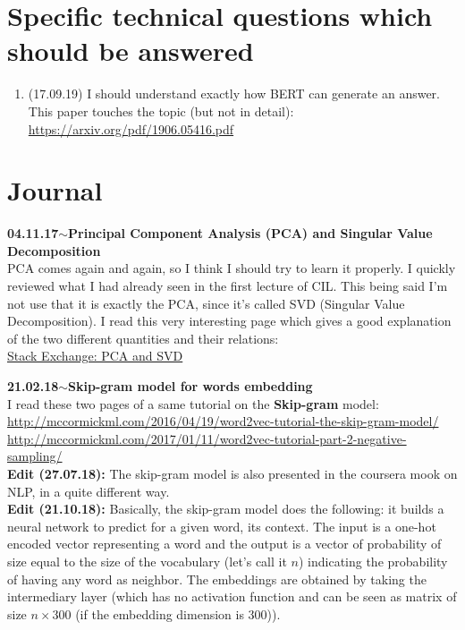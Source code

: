 \documentclass[11pt,a4paper]{article}
\newenvironment{loggentry}[2]%
{\noindent\textbf{#1}\hspace{1cm}$\mathbf{\sim}$\text{ }\textbf{#2}\\}{\vspace{0.5cm}}
\begin{document}
\section{Specific technical questions which should be answered}
\begin{enumerate}
\item (17.09.19) I should understand exactly how BERT can generate an answer. This paper touches the topic (but not in detail):\\
\url{https://arxiv.org/pdf/1906.05416.pdf}
\end{enumerate}

\section{Journal}

\begin{loggentry}{04.11.17}{Principal Component Analysis (PCA) and Singular Value Decomposition}
PCA comes again and again, so I think I should try to learn it properly. I quickly reviewed what I had already seen in the first lecture of CIL. This being said I'm not use that it is exactly the PCA, since it's called SVD (Singular Value Decomposition). I read this very interesting page which gives a good explanation of the two different quantities and their relations:\\
\href{https://stats.stackexchange.com/questions/134282/relationship-between-svd-and-pca-how-to-use-svd-to-perform-pca#134283}{Stack Exchange: PCA and SVD}\\
\end{loggentry}

\begin{loggentry}{21.02.18}{Skip-gram model for words embedding}
I read these two pages of a same tutorial on the \textbf{Skip-gram} model:\\
\url{http://mccormickml.com/2016/04/19/word2vec-tutorial-the-skip-gram-model/}\\
\url{http://mccormickml.com/2017/01/11/word2vec-tutorial-part-2-negative-sampling/}\\
\textbf{Edit (27.07.18):} The skip-gram model is also presented in the coursera mook on NLP, in a quite different way.\\
\textbf{Edit (21.10.18):} Basically, the skip-gram model does the following: it builds a neural network to predict for a given word, its context. The input is a one-hot encoded vector representing a word and the output is a vector of probability of size equal to the size of the vocabulary (let's call it $n$) indicating the probability of having any word as neighbor. The embeddings are obtained by taking the intermediary layer (which has no activation function and can be seen as matrix of size $n\times 300$ (if the embedding dimension is $300$)).
\end{loggentry}
\end{document}
